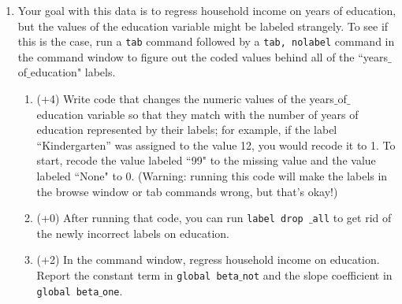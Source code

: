 \documentclass[12pt, oneside]{article}
\begin{document}
\begin{enumerate}
\begin{enumerate}
    \item Your goal with this data is to regress household income on years of education, but the values of the education variable might be labeled strangely. To see if this is the case, run a \texttt{tab} command followed by a \texttt{tab, nolabel} command in the command window to figure out the coded values behind all of the ``years$\_$of$\_$education" labels.
    \begin{enumerate}
    \item (+4) Write code that changes the numeric values of the years$\_$of$\_$education variable so that they match with the number of years of education represented by their labels; for example, if the label ``Kindergarten'' was assigned to the value 12, you would recode it to 1. To start, recode the value labeled ``99" to the missing value and the value labeled ``None" to 0. (Warning: running this code will make the labels in the browse window or tab commands wrong, but that's okay!)
    \item (+0) After running that code, you can run \texttt{label drop $\_$all} to get rid of the newly incorrect labels on education.
    \item (+2) In the command window, regress household income on education. Report the constant term in \texttt{global beta$\_$not} and the slope coefficient in \texttt{global beta$\_$one}.
    \end{enumerate}
\end{enumerate}
\end{enumerate}
\end{document}
